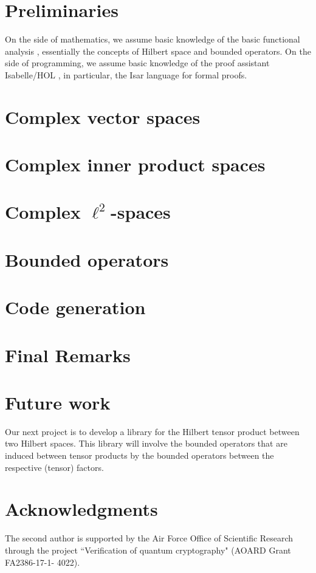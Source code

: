 \documentclass[12pt]{article}
\theoremstyle{definition}
\begin{document}
\section{Preliminaries}
On the side of mathematics, we assume basic knowledge of the basic functional analysis \cite{conway2019course}, essentially the concepts of Hilbert space and bounded operators. On the side of programming, we assume basic knowledge of the proof assistant Isabelle/HOL \cite{nipkow2002isabelle}, in particular, the Isar language for formal proofs.


\section{Complex vector spaces}
\blindtext[6]

\section{Complex inner product spaces}
\blindtext[6]

\section{Complex $\ell^2$-spaces}
\blindtext[6]

\section{Bounded operators}
\blindtext[6]

\section{Code generation}
\blindtext[6]


\section{Final Remarks}
\blindtext[3]


\section{Future work}
Our next project is to develop a library for the Hilbert tensor product between two Hilbert spaces. This library will involve the bounded operators that are induced between tensor products by the bounded operators between the respective (tensor) factors.


\section*{Acknowledgments}
The second author is supported by the Air Force Office of Scientific Research
through the project ``Verification of quantum cryptography" (AOARD Grant
FA2386-17-1- 4022).




\end{document}
